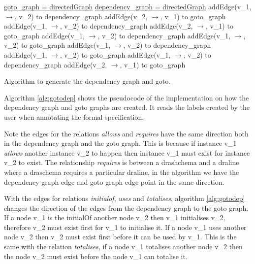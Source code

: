 \begin{algorithm}[H] \underline{goto\_graph = directedGraph} \;
\underline{dependency\_graph = directedGraph} \; \SetAlgoLined
{} 
{addEdge(v\_1, $\rightarrow$, v\_2) to dependency\_graph \; addEdge(v\_2,
$\rightarrow$, v\_1)  to goto\_graph\;}
{addEdge(v\_1, $\rightarrow$, v\_2) to dependency\_graph \; addEdge(v\_2,
$\rightarrow$, v\_1)  to goto\_graph \;}
{addEdge(v\_1, $\rightarrow$, v\_2) to dependency\_graph \; addEdge(v\_1,
$\rightarrow$, v\_2)  to goto\_graph \;}
{addEdge(v\_1, $\rightarrow$, v\_2) to dependency\_graph \; addEdge(v\_1,
$\rightarrow$, v\_2)  to goto\_graph \;}
{addEdge(v\_1, $\rightarrow$, v\_2) to dependency\_graph \; addEdge(v\_2,
$\rightarrow$, v\_1)  to goto\_graph \;}
\caption{Algorithm to generate the dependency graph and goto. \label{alg:gotodep} }
\end{algorithm}
\vspace{0.2in}


Algorithm \ref{alg:gotodep} shows the pseudocode of the implementation on how
the dependency graph and goto graphs are created. It reads the labels created by
the user when annotating the formal specification. 

Note the edges for the relations \emph{allows} and \emph{requires} have the same
direction both in the dependency graph and the goto graph. This is because if
instance v\_1 \emph{allows} another instance v\_2 to happen then instance v\_1
must exist for instance v\_2 to exist. The relationship \emph{requires} is
between a drashchema and a draline where a draschema requires a particular
draline, in the algorithm we have the dependency graph edge and goto graph edge
point in the same direction.

With the edges for relations \emph{initialof}, \emph{uses} and \emph{totalises},
algorithm \ref{alg:gotodep} changes the direction of the edges from the
dependency graph to the goto graph. If a node v\_1 is the initialOf another node
v\_2 then v\_1 initialises v\_2, therefore v\_2 must exist first for v\_1 to
initialise it. If a node v\_1 uses another node v\_2 then v\_2 must exist first
before it can be used by v\_1. This is the same with the relation
\emph{totalises}, if a node v\_1 totalises another node v\_2 then the node v\_2
must exist before the node v\_1 can totalise it.

